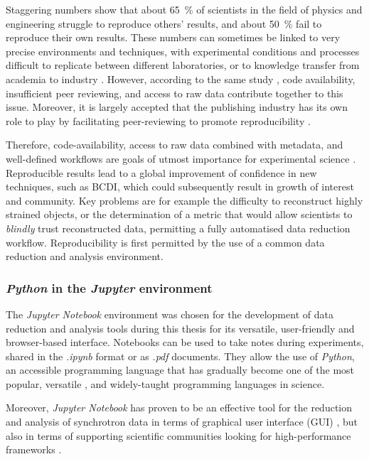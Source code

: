 Staggering numbers \parencite{Baker2016} show that about \qty{65}{\percent} of scientists in the field of physics and engineering struggle to reproduce others' results, and about \qty{50}{\percent} fail to reproduce their own results.
These numbers can sometimes be linked to very precise environments and techniques, with experimental conditions and processes difficult to replicate between different laboratories, or to knowledge transfer from academia to industry \parencite{Sarwitz2015}.
However, according to the same study \parencite{Baker2016}, code availability, insufficient peer reviewing, and access to raw data contribute together to this issue.
Moreover, it is largely accepted that the publishing industry has its own role to play by facilitating peer-reviewing to promote reproducibility \parencite{Lee2017}.

Therefore, code-availability, access to raw data combined with metadata, and well-defined workflows are goals of utmost importance for experimental science \parencite{Munafo2017}.
Reproducible results lead to a global improvement of confidence in new techniques, such as BCDI, which could subsequently result in growth of interest and community.
Key problems are for example the difficulty to reconstruct highly strained objects, or the determination of a metric that would allow scientists to \textit{blindly} trust reconstructed data, permitting a fully automatised data reduction workflow.
Reproducibility is first permitted by the use of a common data reduction and analysis environment.

\subsubsection{\textit{Python} in the \textit{Jupyter} environment}

The \textit{Jupyter Notebook} environment \parencite{Perez2007, Kluyver2016} was chosen for the development of data reduction and analysis tools during this thesis for its versatile, user-friendly and browser-based interface.
Notebooks can be used to take notes during experiments, shared in the \textit{.ipynb} format or as \textit{.pdf} documents.
They allow the use of \textit{Python}, an accessible programming language that has gradually become one of the most popular, versatile \parencite{Perez2007, Behnel2011, Newville2016, Ronaghi2017}, and widely-taught \parencite{Ayer2014, Scopatz2015, McKinney2017, Boulle2019} programming languages in science.

Moreover, \textit{Jupyter Notebook} has proven to be an effective tool for the reduction and analysis of synchrotron data in terms of graphical user interface (GUI) \parencite{Martini2019a,Simonne2020}, but also in terms of supporting scientific communities looking for high-performance frameworks \parencite{jupyter_computing_4, jupyter_computing_1, jupyter_computing_3, jupyter_computing_2}.

